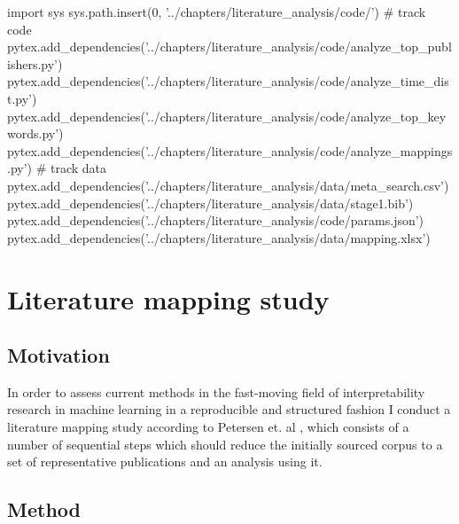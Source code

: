 % 
\begin{pycode}
import sys
sys.path.insert(0, '../chapters/literature_analysis/code/')
# track code
pytex.add_dependencies('../chapters/literature_analysis/code/analyze_top_publishers.py')
pytex.add_dependencies('../chapters/literature_analysis/code/analyze_time_dist.py')
pytex.add_dependencies('../chapters/literature_analysis/code/analyze_top_keywords.py')
pytex.add_dependencies('../chapters/literature_analysis/code/analyze_mappings.py')
# track data
pytex.add_dependencies('../chapters/literature_analysis/data/meta_search.csv')
pytex.add_dependencies('../chapters/literature_analysis/data/stage1.bib')
pytex.add_dependencies('../chapters/literature_analysis/code/params.json')
pytex.add_dependencies('../chapters/literature_analysis/data/mapping.xlsx')
\end{pycode}

\chapter{Literature mapping study}
\label{chap:literature_analysis}

\section{Motivation}

In order to assess current methods in the fast-moving field of interpretability research in machine learning in a reproducible and structured fashion I conduct a literature mapping study according to Petersen et. al \cite{petersenSystematicMappingStudies}, which consists of a number of sequential steps which should reduce the initially sourced corpus to a set of representative publications and an analysis using it.

\section{Method}

